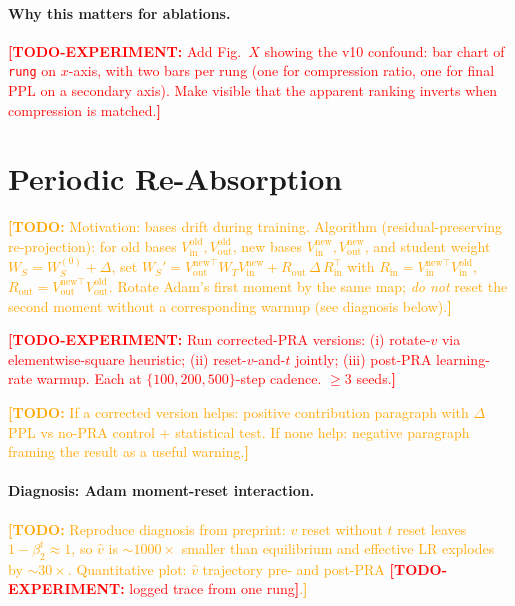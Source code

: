 \documentclass{article}
\newcommand{\todo}[1]{\textcolor{orange}{\textbf{[TODO:} #1\textbf{]}}}
\newcommand{\todoexp}[1]{\textcolor{red}{\textbf{[TODO-EXPERIMENT:} #1\textbf{]}}}
\newcommand{\Vin}{V_{\mathrm{in}}}
\newcommand{\Vout}{V_{\mathrm{out}}}
\begin{document}
\paragraph{Why this matters for ablations.}
\todoexp{Add Fig.~$X$ showing the v10 confound: bar chart of \texttt{rung}
on $x$-axis, with two bars per rung (one for compression ratio, one for
final PPL on a secondary axis). Make visible that the apparent ranking
inverts when compression is matched.}

\section{Periodic Re-Absorption}
\label{sec:pra}
\todo{Motivation: bases drift during training. Algorithm
(residual-preserving re-projection): for old bases
$\Vin^{\mathrm{old}}, \Vout^{\mathrm{old}}$, new bases
$\Vin^{\mathrm{new}}, \Vout^{\mathrm{new}}$, and student weight
$W_S = W_S^{(0)} + \Delta$, set
$W_S' = \Vout^{\mathrm{new}\top} W_T \Vin^{\mathrm{new}}
       + R_{\mathrm{out}} \, \Delta \, R_{\mathrm{in}}^\top$
with $R_{\mathrm{in}}=\Vin^{\mathrm{new}\top}\Vin^{\mathrm{old}}$,
$R_{\mathrm{out}}=\Vout^{\mathrm{new}\top}\Vout^{\mathrm{old}}$. Rotate
Adam's first moment by the same map; \emph{do not} reset the second
moment without a corresponding warmup (see diagnosis below).}

\todoexp{Run corrected-PRA versions: (i) rotate-$v$ via elementwise-square
heuristic; (ii) reset-$v$-and-$t$ jointly; (iii) post-PRA learning-rate
warmup. Each at $\{100, 200, 500\}$-step cadence. $\geq$3 seeds.}

\todo{If a corrected version helps: positive contribution paragraph with
$\Delta$PPL vs no-PRA control + statistical test. If none help: negative
paragraph framing the result as a useful warning.}

\paragraph{Diagnosis: Adam moment-reset interaction.}
\todo{Reproduce diagnosis from preprint: $v$ reset without $t$ reset leaves
$1 - \beta_2^t \approx 1$, so $\hat{v}$ is $\sim 1000\times$ smaller than
equilibrium and effective LR explodes by $\sim$$30\times$. Quantitative
plot: $\hat{v}$ trajectory pre- and post-PRA \todoexp{logged trace from
one rung}.}
\end{document}
